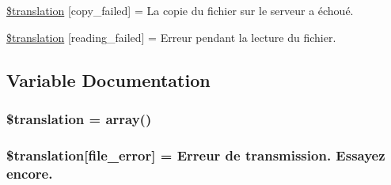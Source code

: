 \begin{DoxyCompactItemize}
\item 
\hyperlink{class_8upload_8fr___f_r_8php_a783c9358bcf54a054545b50098bc679b}{\$translation} \mbox{[}\textquotesingle{}copy\+\_\+failed\textquotesingle{}\mbox{]} = \textquotesingle{}La copie du fichier sur le serveur a échoué.\textquotesingle{}
\item 
\hyperlink{class_8upload_8fr___f_r_8php_a01bea14c9fd5f353f62db44beabfcd42}{\$translation} \mbox{[}\textquotesingle{}reading\+\_\+failed\textquotesingle{}\mbox{]} = \textquotesingle{}Erreur pendant la lecture du fichier.\textquotesingle{}
\end{DoxyCompactItemize}


\subsection{Variable Documentation}
\hypertarget{class_8upload_8fr___f_r_8php_a1f198d410fecc3871ebdd468d343a5e3}{}
\subsubsection[{\$translation}]{\setlength{\rightskip}{0pt plus 5cm}\$translation = array()}\label{class_8upload_8fr___f_r_8php_a1f198d410fecc3871ebdd468d343a5e3}
\hypertarget{class_8upload_8fr___f_r_8php_ac7498e49b9771b04698029aa61c70821}{}
\subsubsection[{\$translation}]{\setlength{\rightskip}{0pt plus 5cm}\$translation\mbox{[}\textquotesingle{}file\+\_\+error\textquotesingle{}\mbox{]} = \textquotesingle{}Erreur de transmission. Essayez encore.\textquotesingle{}}\label{class_8upload_8fr___f_r_8php_ac7498e49b9771b04698029aa61c70821}
\hypertarget{class_8upload_8fr___f_r_8php_a6ec3d3a47ab70d77e7aa593e82ead10e}{}
